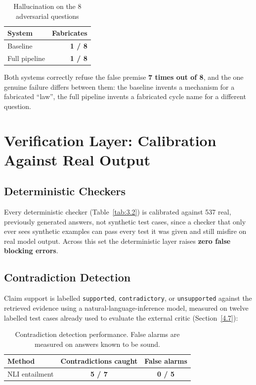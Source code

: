 \begin{table}[h]
\centering
\caption{Hallucination on the 8 adversarial questions}
\label{tab:4.3}
\begin{tabular}{@{}lr@{}}
\toprule
\textbf{System} & \textbf{Fabricates} \\
\midrule
Baseline & \textbf{1 / 8} \\
Full pipeline & \textbf{1 / 8} \\
\bottomrule
\end{tabular}
\end{table}

Both systems correctly refuse the false premise \textbf{7 times out of
8}, and the one genuine failure differs between them: the baseline invents
a mechanism for a fabricated ``law'', the full pipeline invents a
fabricated cycle name for a different question.

\section{Verification Layer: Calibration Against Real Output}\label{4.6}

\subsection{Deterministic Checkers}\label{4.6.2}

Every deterministic checker (Table~\ref{tab:3.2}) is calibrated against
537 real, previously generated answers, not synthetic test cases, since a
checker that only ever sees synthetic examples can pass every test it was
given and still misfire on real model output. Across this set the
deterministic layer raises \textbf{zero false blocking errors}.

\subsection{Contradiction Detection}\label{4.6.3}

Claim support is labelled \texttt{supported}, \texttt{contradictory}, or
\texttt{unsupported} against the retrieved evidence using a
natural-language-inference model, measured on twelve labelled test cases
already used to evaluate the external critic (Section~\ref{4.7}):

\begin{table}[h]
\centering
\caption[Contradiction detection performance]{Contradiction detection
performance. False alarms are measured on answers known to be sound.}
\label{tab:4.4}
\begin{tabular}{@{}lcc@{}}
\toprule
\textbf{Method} & \textbf{Contradictions caught} & \textbf{False alarms} \\
\midrule
NLI entailment & \textbf{5 / 7} & \textbf{0 / 5} \\
\bottomrule
\end{tabular}
\end{table}

